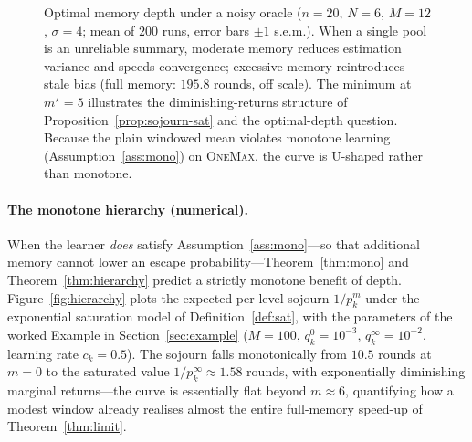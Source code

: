 \documentclass[11pt,a4paper]{article}
\newcommand{\E}{\mathbb{E}}
\begin{document}
\begin{figure}[ht]
\centering
{}
\caption{Optimal memory depth under a noisy oracle
  ($n=20$, $N=6$, $M=12$, $\sigma=4$; mean of
  $200$ runs, error bars $\pm1$ s.e.m.).  When a single pool is an
  unreliable summary, moderate memory reduces estimation variance and
  speeds convergence; excessive memory reintroduces stale bias (full
  memory: $195.8$ rounds, off scale).  The minimum at $m^\star=5$
  illustrates the diminishing-returns structure of
  Proposition~\ref{prop:sojourn-sat} and the optimal-depth question.  Because the
  plain windowed mean violates monotone learning (Assumption~\ref{ass:mono}) on
  \textsc{OneMax}, the curve is U-shaped rather than monotone.}
\label{fig:optdepth}
\end{figure}

\paragraph{The monotone hierarchy (numerical).}

When the learner \emph{does} satisfy Assumption~\ref{ass:mono}---so that
additional memory cannot lower an escape probability---Theorem~\ref{thm:mono}
and Theorem~\ref{thm:hierarchy} predict a strictly monotone benefit of
depth.  Figure~\ref{fig:hierarchy} plots the expected per-level sojourn
$1/p_k^m$ under the exponential saturation model of
Definition~\ref{def:sat}, with the parameters of the worked Example in
Section~\ref{sec:example} ($M=100$, $q_k^0=10^{-3}$, $q_k^\infty=10^{-2}$,
learning rate $c_k=0.5$).  The sojourn falls monotonically from $10.5$
rounds at $m=0$ to the saturated value $1/p_k^\infty\approx1.58$ rounds,
with exponentially diminishing marginal returns---the curve is essentially
flat beyond $m\approx6$, quantifying how a modest window already realises
almost the entire full-memory speed-up of Theorem~\ref{thm:limit}.
\end{document}
